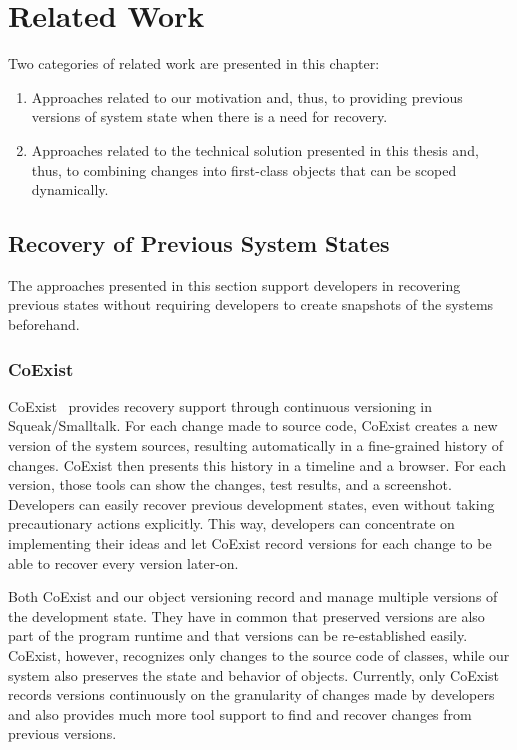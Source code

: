 \chapter{Related Work} \label{chapter:RELATED_WORK}

Two categories of related work are presented in this chapter:

\begin{enumerate}
    \item Approaches related to our motivation and, thus, to providing previous versions of system state when there is a need for recovery.
    \item Approaches related to the technical solution presented in this thesis and, thus, to combining changes into first-class objects that can be scoped dynamically.
\end{enumerate}


\section{Recovery of Previous System States}

The approaches presented in this section support developers in recovering previous states without requiring developers to create snapshots of the systems beforehand.


\subsection{CoExist}

CoExist~\cite{Steinert2012COE} provides recovery support through continuous versioning in Squeak/Smalltalk.
For each change made to source code, CoExist creates a new version of the system sources, resulting automatically in a fine-grained history of changes.
CoExist then presents this history in a timeline and a browser.
For each version, those tools can show the changes, test results, and a screenshot.
Developers can easily recover previous development states, even without taking precautionary actions explicitly.
This way, developers can concentrate on implementing their ideas and let CoExist record versions for each change to be able to recover every version later-on.

Both CoExist and our object versioning record and manage multiple versions of the development state.
They have in common that preserved versions are also part of the program runtime and that versions can be re-established easily.
CoExist, however, recognizes only changes to the source code of classes, while our system also preserves the state and behavior of objects.
Currently, only CoExist records versions continuously on the granularity of changes made by developers and also provides much more tool support to find and recover changes from previous versions.


